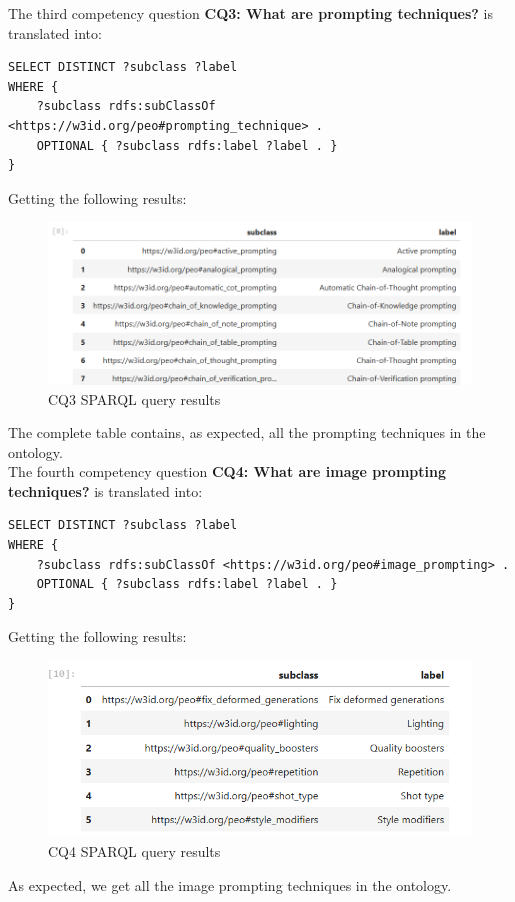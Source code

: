 The third competency question \textbf{CQ3: What are prompting techniques?} is translated into:
\begin{lstlisting}
SELECT DISTINCT ?subclass ?label
WHERE {
    ?subclass rdfs:subClassOf <https://w3id.org/peo#prompting_technique> .
    OPTIONAL { ?subclass rdfs:label ?label . }
}
\end{lstlisting}
Getting the following results:
\begin{figure}[H]
    \centering
    \includegraphics[width=0.9\linewidth]{Figures/fig_49.png}
    \caption{CQ3 SPARQL query results}
    \label{fig:enter-label}
\end{figure}
The complete table contains, as expected, all the prompting techniques in the ontology.\\

The fourth competency question \textbf{CQ4: What are image prompting techniques?} is translated into:
\begin{lstlisting}
SELECT DISTINCT ?subclass ?label
WHERE {
    ?subclass rdfs:subClassOf <https://w3id.org/peo#image_prompting> .
    OPTIONAL { ?subclass rdfs:label ?label . }
}
\end{lstlisting}
Getting the following results:
\begin{figure}[H]
    \centering
    \includegraphics[width=0.9\linewidth]{Figures/fig_50.png}
    \caption{CQ4 SPARQL query results}
    \label{fig:enter-label}
\end{figure}
As expected, we get all the image prompting techniques in the ontology.\\

